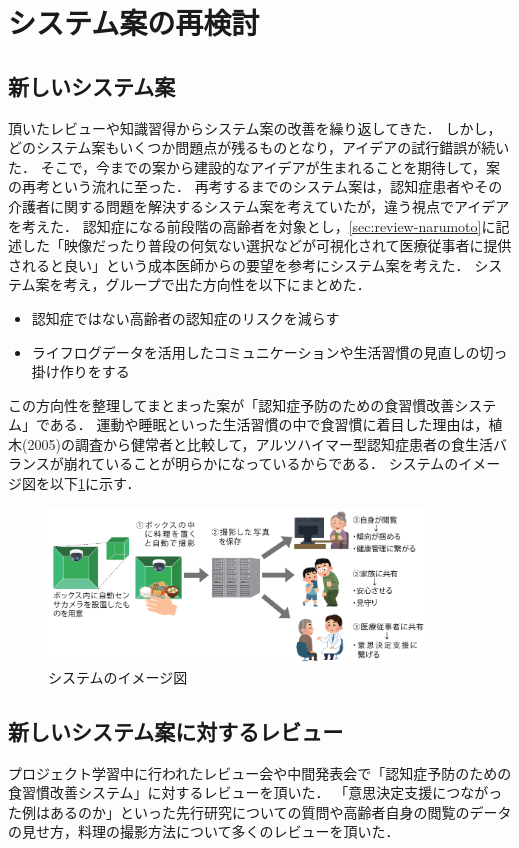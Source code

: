 \documentclass[../report]{subfiles}
\begin{document}
\section{システム案の再検討}
\subsection{新しいシステム案}
頂いたレビューや知識習得からシステム案の改善を繰り返してきた．
しかし，どのシステム案もいくつか問題点が残るものとなり，アイデアの試行錯誤が続いた．
そこで，今までの案から建設的なアイデアが生まれることを期待して，案の再考という流れに至った．
再考するまでのシステム案は，認知症患者やその介護者に関する問題を解決するシステム案を考えていたが，違う視点でアイデアを考えた．
認知症になる前段階の高齢者を対象とし，\ref{sec:review-narumoto}に記述した「映像だったり普段の何気ない選択などが可視化されて医療従事者に提供されると良い」という成本医師からの要望を参考にシステム案を考えた．
システム案を考え，グループで出た方向性を以下にまとめた．
\begin{itemize}
    \item 認知症ではない高齢者の認知症のリスクを減らす
    \item ライフログデータを活用したコミュニケーションや生活習慣の見直しの切っ掛け作りをする
\end{itemize}
この方向性を整理してまとまった案が「認知症予防のための食習慣改善システム」である．
運動や睡眠といった生活習慣の中で食習慣に着目した理由は，植木(2005)の調査から健常者と比較して，アルツハイマー型認知症患者の食生活バランスが崩れていることが明らかになっている\cite{ueki}からである．
システムのイメージ図を以下\ref{fig:sys-image}に示す．
\begin{figure}[htbp]
    \begin{center}
        \includegraphics[width=10cm]{imgs/system-overview.png}
        \caption{システムのイメージ図}
        \label{fig:sys-image}
    \end{center}
\end{figure}

\subsection{新しいシステム案に対するレビュー}
プロジェクト学習中に行われたレビュー会や中間発表会で「認知症予防のための食習慣改善システム」に対するレビューを頂いた．
「意思決定支援につながった例はあるのか」といった先行研究についての質問や高齢者自身の閲覧のデータの見せ方，料理の撮影方法について多くのレビューを頂いた．
\end{document}
